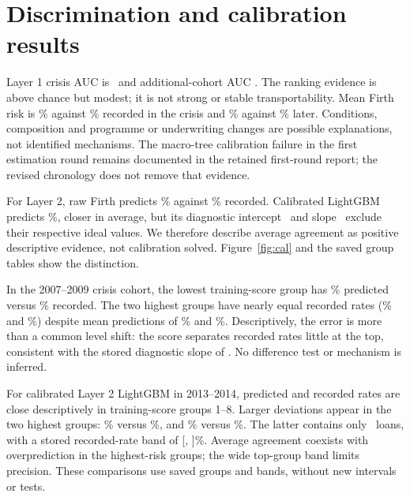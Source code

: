 \section{Discrimination and calibration results}

Layer 1 crisis AUC is \AucCrisis\ and additional-cohort AUC \AucLater. The ranking evidence is above chance but modest; it is not strong or stable transportability. Mean Firth risk is \PdCrisis\% against \RateCrisis\% recorded in the crisis and \PdLater\% against \RateLater\% later. Conditions, composition and programme or underwriting changes are possible explanations, not identified mechanisms. The macro-tree calibration failure in the first estimation round remains documented in the retained first-round report; the revised chronology does not remove that evidence.

For Layer 2, raw Firth predicts \LtwoFirth\% against \LtwoRate\% recorded. Calibrated LightGBM predicts \LtwoTree\%, closer in average, but its diagnostic intercept \TreeIntercept\ and slope \TreeSlope\ exclude their respective ideal values. We therefore describe average agreement as positive descriptive evidence, not calibration solved. Figure~\ref{fig:cal} and the saved group tables show the distinction.

In the 2007--2009 crisis cohort, the lowest training-score group has \CrisisGroupOnePred\% predicted versus \CrisisGroupOneRecorded\% recorded. The two highest groups have nearly equal recorded rates (\CrisisGroupNineRecorded\% and \CrisisGroupTenRecorded\%) despite mean predictions of \CrisisGroupNinePred\% and \CrisisGroupTenPred\%. Descriptively, the error is more than a common level shift: the score separates recorded rates little at the top, consistent with the stored diagnostic slope of \CrisisDiagnosticSlope. No difference test or mechanism is inferred.

For calibrated Layer 2 LightGBM in 2013--2014, predicted and recorded rates are close descriptively in training-score groups 1--8. Larger deviations appear in the two highest groups: \TreeGroupNinePred\% versus \TreeGroupNineRecorded\%, and \TreeGroupTenPred\% versus \TreeGroupTenRecorded\%. The latter contains only \TreeGroupTenN\ loans, with a stored recorded-rate band of [\TreeGroupTenLower, \TreeGroupTenUpper]\%. Average agreement coexists with overprediction in the highest-risk groups; the wide top-group band limits precision. These comparisons use saved groups and bands, without new intervals or tests.

